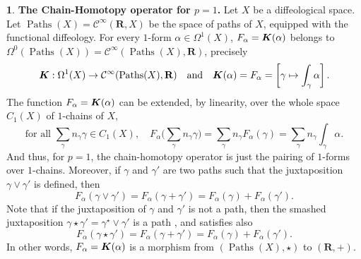 \documentclass[11pt,reqno]{amsart}
\theoremstyle{definition}
\newtheorem{article}{}
\newcommand{\artlabel}[1]{{\bf #1.}}
\newcommand{\qmbox}[1]{\quad \mbox{#1}\quad}
\newcommand{\RR}{{\mathbf R}}
\def \F{{F}}
\def \X{{X}}
\newcommand{\cC}{{\mathcal C}}
\newcommand{\eK}{\mbox{\boldmath $K$}}
\newcommand{\DForms}{\Omega}
\newcommand{\Paths}{\operatorname{Paths}}
\newcommand{\DChains}[1]{C_{#1}}
\newcommand{\Cinf}{{\cC}^\infty}
\begin{document}
  \begin{article}\artlabel{The Chain-Homotopy operator for $p = 1$} 
    \label{The-Chain-Homotopy-operator-for-p=1}
    Let $\X$ be a diffeological space. Let $\Paths(\X) =
      \Cinf(\RR,\X)$ be the space of paths of $\X$, equipped
    with the functional diffeology. For every $1$-form
    $\alpha \in \DForms^1(\X)$, $\F_\alpha =  \eK(\alpha)$
    belongs to $\DForms^0(\Paths(\X)) = 
      \Cinf(\Paths(\X),\RR)$, precisely
    $$
      \eK : \DForms^1(\X) \to \Cinf(\Paths(\X),\RR)
      \qmbox{and} \eK(\alpha) = \F_\alpha = \left[
      \gamma \mapsto \int_\gamma\alpha\right].
      $$
    The function $\F_\alpha =
      \eK(\alpha)$ can be extended, by linearity, over the whole
    space $\DChains{1}(\X)$ of $1$-chains of $\X$,
    $$
      \mbox{for
      all } \sum_\gamma n_\gamma \gamma \in \DChains{1}(\X),
      \quad \F_\alpha\bigg(\sum_\gamma n_\gamma \gamma\bigg)
      = \sum_{\gamma} n_\gamma \F_\alpha(\gamma) = 
      \sum_\gamma n_\gamma \int_\gamma \alpha.
      $$
    And thus, for $p = 1$, the
    chain-homotopy operator is just the pairing
    of $1$-forms over $1$-chains. Moreover, if $\gamma$ and
    $\gamma'$ are two paths such that the juxtaposition
    $\gamma\vee\gamma'$ is defined, then
    \begin{equation}
      \renewcommand{\theequation}{$\diamondsuit$}
      \F_\alpha(\gamma\vee\gamma') = \F_\alpha(\gamma +
      \gamma') =  \F_\alpha(\gamma) + \F_\alpha(\gamma').
    \end{equation}
    Note that if the juxtaposition of
    $\gamma$ and $\gamma'$ is not a path, then the
    smashed juxtaposition $\gamma\star\gamma' = 
      \gamma^\star\vee\gamma'$ is a path
    \cite{Piz05}, and satisfies also
    \begin{equation}
      \renewcommand{\theequation}{$\heartsuit$}
      \F_\alpha(\gamma \star\gamma') = \F_\alpha(\gamma +
      \gamma') = \F_\alpha(\gamma) +
      \F_\alpha(\gamma').
    \end{equation}
    In other words,
    $\F_\alpha = \eK(\alpha)$ is a morphism from
    $(\Paths(\X),\star)$ to $(\RR,+)$.
  \end{article} %
  
\end{document}
